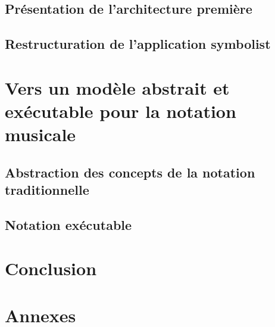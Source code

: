 \documentclass[utf8,final]{stageM2R} %
\begin{document}
	\section{Présentation de l'architecture première}
	\label{sec:architecturePremiere}
	

	\section{Restructuration de l'application symbolist}
	\label{sec:restructurationSymbolist}
	

\chapter{Vers un modèle abstrait et exécutable pour la notation musicale}
\label{chap:modeleDeNotation}
	
	\section{Abstraction des concepts de la notation traditionnelle}
	\label{sec:abstractionConcepts}
	

	\section{Notation exécutable}
	\label{sec:notationExecutable}
	
	
\clearpage
\chapter{Conclusion}


\printbibliography

\listoffigures

\printglossary

\appendix
\chapter{Annexes}

\end{document}
